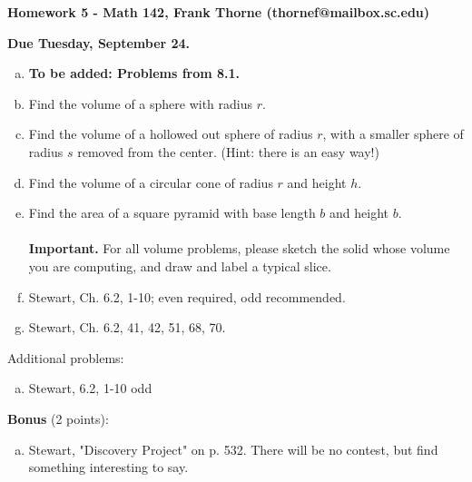 \documentclass[12pt]{article}
\begin{document}
\setlength{\topmargin}{-2mm}





\begin{center}{\bf Homework 5 - Math 142, Frank Thorne (thornef@mailbox.sc.edu)}
\end{center}
\begin{center}
{\bf Due Tuesday, September 24.} 
\end{center}

\begin{enumerate}[(a)]
\item
{\bf To be added: Problems from 8.1.}
\item
Find the volume of a sphere with radius $r$.

\item
Find the volume of a hollowed out sphere of radius $r$, with a smaller sphere
of radius $s$ removed from the center. (Hint: there is an easy way!)

\item
Find the volume of a circular cone of radius $r$ and height $h$.

\item
Find the area of a square pyramid with base length $b$ and height $b$.
\\
\\
{\bf Important.} For all volume problems, please sketch the solid whose volume
you are computing, and draw and label a typical slice.
\item
Stewart, Ch. 6.2, 1-10; even required, odd recommended.

\item
Stewart, Ch. 6.2, 41, 42, 51, 68, 70.
\end{enumerate}
Additional problems:

\begin{enumerate}[(a)]
\item
Stewart, 6.2, 1-10 odd%
\end{enumerate}
{\bf Bonus} (2 points):
\begin{enumerate}[(a)]
\item
Stewart, "Discovery Project" on p. 532. There will be no contest, but find something interesting
to say.
\end{enumerate}
\end{document}
